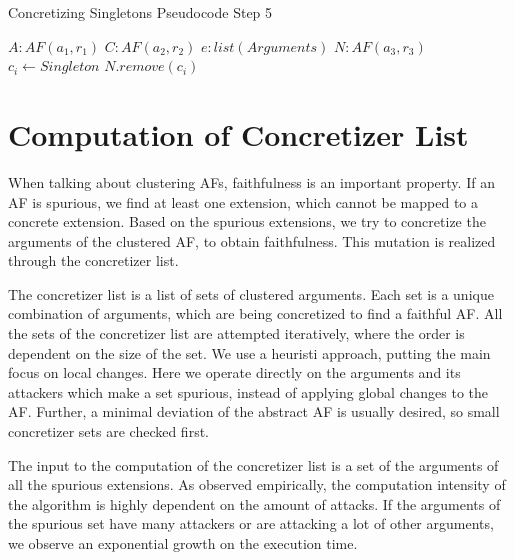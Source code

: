 \begin{algorithm}[H]
    \caption{Concretizing Singletons Pseudocode Step 5}\label{alg:concretizingSingletonsStep5}
    \begin{algorithmic}[1]
        \Require $A: AF(a_1, r_1)$ 
        \Require $C: AF(a_2, r_2)$ 
        \Require $e: list(Arguments)$ 
        \Require $N: AF(a_3, r_3)$ 
                \State $c_i \gets Singleton$
                \State $N.remove(c_i)$
            \EndIf
        \EndFor
    \end{algorithmic}
\end{algorithm}


\newpage
\section{Computation of Concretizer List}
\label{sec:ComputationOfConcretizerList}
When talking about clustering AFs, faithfulness is an important property. If an AF is spurious, we find at least one extension, which cannot be mapped to a concrete extension. Based on the spurious extensions, we try to concretize the arguments of the clustered AF, to obtain faithfulness. This mutation is realized through the concretizer list.

The concretizer list is a list of sets of clustered arguments. Each set is a unique combination of arguments, which are being concretized to find a faithful AF. All the sets of the concretizer list are attempted iteratively, where the order is dependent on the size of the set. We use a heuristi approach, putting the main focus on local changes. Here we operate directly on the arguments and its attackers which make a set spurious, instead of applying global changes to the AF. Further, a minimal deviation of the abstract AF is usually desired, so small concretizer sets are checked first.

The input to the computation of the concretizer list is a set of the arguments of all the spurious extensions. 
As observed empirically, the computation intensity of the algorithm is highly dependent on the amount of attacks. If the arguments of the spurious set have many attackers or are attacking a lot of other arguments, we observe an exponential growth on the execution time.


